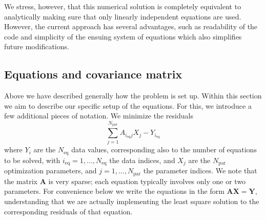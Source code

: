 We stress, however, that this numerical solution is completely equivalent to analytically making sure that only linearly independent equations are used. However, the current approach has several advantages, such as readability of the code and simplicity of the ensuing system of equations which also simplifies future modifications.

\subsection {Equations and covariance matrix}

Above we have described generally how the problem is set up. Within this section we aim to describe our specific setup of the equations. For this, we introduce a few additional pieces of notation. We minimize the residuals
\begin{equation}
    \sum_{j=1}^{N_\mathrm{par}} A_{i_\mathrm{eq} j} X_j - Y_{i_\mathrm{eq}}
    \label {eq:coefficient_form}
\end{equation}
where $ Y_i $ are the $ N_\mathrm{eq} $ data values, corresponding also to the number of equations to be solved, with $ i_\mathrm{eq} = 1, \dots, N_\mathrm{eq} $ the data indices, and $ X_j $ are the $ N_\mathrm{par} $ optimization parameters, and $ j = 1, \dots, N_\mathrm{par} $ the parameter indices.  We note that the matrix $ \mathbf {A} $ is very sparse; each equation typically involves only one or two parameters. For convenience below we write the equations in the form $\mathbf{A} \mathbf{X} = \mathbf{Y}$, understanding that we are actually implementing the least square solution to the corresponding residuals of that equation.

